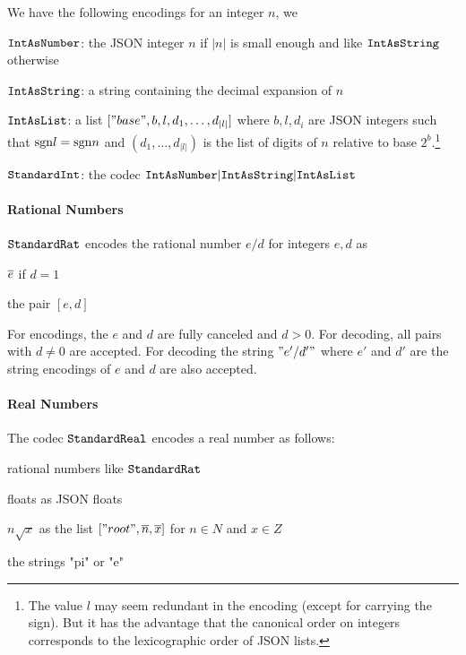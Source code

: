 We have the following encodings for an integer $n$, we

$\cn{IntAsNumber}$: the JSON integer $n$ if $|n|$ is small enough and like $\cn{IntAsString}$ otherwise

$\cn{IntAsString}$: a string containing the decimal expansion of $n$

$\cn{IntAsList}$: a list $["base",b,l,d_1,\ldots,d_{|l|}]$ where $b,l,d_i$ are JSON integers such that $\sgn l=\sgn n$ and $(d_1,\ldots,d_|l|)$ is the list of digits of $n$ relative to base $2^b$.\footnote{The value $l$ may seem redundant in the encoding (except for carrying the sign). But it has the advantage that the canonical order on integers corresponds to the lexicographic order of JSON lists.}

$\cn{StandardInt}$: the codec $\cunion{\cn{IntAsNumber},\cn{IntAsString},\cn{IntAsList}}$

\paragraph{Rational Numbers}
$\cn{StandardRat}$ encodes the rational number $e/d$ for integers $e,d$ as
\begin{compactitem}
 \item $\ov{e}$ if $d=1$
 \item the pair $[e,d]$
\end{compactitem}
For encodings, the $e$ and $d$ are fully canceled and $d>0$. For decoding, all pairs with $d\neq 0$ are accepted.
For decoding the string $"e'/d'"$ where $e'$ and $d'$ are the string encodings of $e$ and $d$ are also accepted.

\paragraph{Real Numbers}
The codec $\cn{StandardReal}$ encodes a real number as follows:
\begin{compactitem}
 \item rational numbers like $\cn{StandardRat}$
 \item floats as JSON floats
 \item $n\sqrt{x}$ as the list $["root",\ov{n},\ov{x}]$ for $n\in N$ and $x\in Z$
 \item the strings "pi" or "e"
\end{compactitem}

